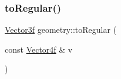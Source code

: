 \mbox{\label{namespacegeometry_ad9a8fab54d9961dad62363d46d8e864c}} 
\subsubsection{\texorpdfstring{toRegular()}{toRegular()}}
{\footnotesize\ttfamily \mbox{\hyperlink{cyclop_8hpp_a5a0a2e85b081623ef3f7e7e8d43024f5}{Vector3f}} geometry\+::to\+Regular (\begin{DoxyParamCaption}\item[{const \mbox{\hyperlink{cyclop_8hpp_ac277e3b99e79f681e1e8b633243a9abf}{Vector4f}} \&}]{v }\end{DoxyParamCaption})}

